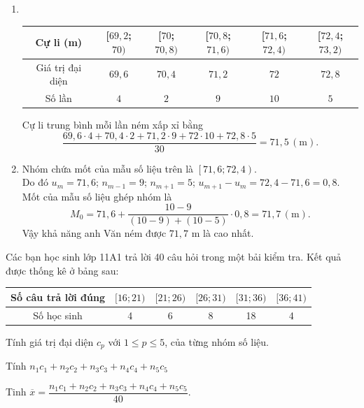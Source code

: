 \begin{ex}
{\begin{enumerate}
\begin{center}
\begin{tabular}{|c|c|c|c|c|c|}
					\hline 
				\end{tabular}
			\end{center}
			\item  \,
			\begin{center}
				\begin{tabular}{|c|c|c|c|c|c|}
					 \hline
					Cự  li (m) & [$69{,}2$;$70)$ & [$70$;$70{,}8)$ & [$70{,}8$;$71{,}6)$ & [$71{,}6$;$72{,}4)$ & [$72{,}4$;$73{,}2)$ \\
					 \hline
					Giá trị đại diện  & $69{,}6$ & $70{,}4$ & $71{,}2$ & $72$ & $72{,}8$ \\
					 \hline
					Số lần & $4$ & $2$  & $9$ & $10$ & $5$ \\
					 \hline
				\end{tabular}
			\end{center}
			Cự li trung bình  mỗi lần ném xấp xỉ bằng $$\dfrac{69{,}6\cdot 4+70{,}4\cdot 2+71{,}2\cdot 9+72\cdot 10+72{,}8\cdot 5}{30}=71{,}5 \,(\text{m}).$$
			\item Nhóm chứa mốt của mẫu số liệu trên là  $\left[71{,}6;72{,}4\right)$.\\
			Do  đó $u_m=71{,}6$; $n_{m-1}=9$; $n_{m+1}=5$; $u_{m+1}-u_m=72{,}4-71{,}6=0{,}8$.\\
			Mốt của mẫu số liệu ghép nhóm  là
			$$M_0=71{,}6+\dfrac{10-9}{\left(10-9\right)+\left(10-5\right)} \cdot 0{,}8=71{,}7\,(\text{m}).$$ 
			Vậy khả năng anh Văn ném được $71{,}7$ m là cao nhất. 
		\end{enumerate}
	 }
\end{ex}

\begin{ex}%
	Các  bạn học sinh lớp 11A1 trả lời 40 câu hỏi trong một bải kiểm tra. Kết quả được thống kê ở bảng sau:
	\begin{center}
		\begin{tabular}{|*{6}{c|}}
			\hline 
			Số  câu trả lời đúng&$[16;21)$&$[21;26)$&$[26;31)$&$[31;36)$&$[36;41)$\\
			 \hline
			Số  học sinh&4&6&8&18&4\\
			\hline 
		\end{tabular}
	\end{center}
	\begin{listEX}
		\item Tính giá trị đại  diện $c_p$ với $1\le p\le 5$, của từng nhóm số liệu.
		\item Tính $n_1c_1+n_2c_2+n_3c_3+n_4c_4+n_5c_5$ 
		\item Tinh  $\overline{x}=\dfrac{n_1c_1+n_2c_2+n_3c_3+n_4c_4+n_5c_5}{40}$.
	\end{listEX}
\end{ex}

